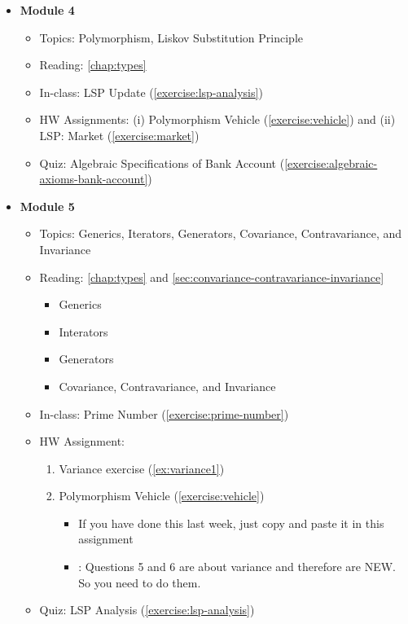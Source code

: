 \documentclass[oneside,11pt,dvipsnames]{book}
\newcommand{\red}[1]{{\color{red}{#1}}}
\begin{document}
\begin{itemize}
    \item \textbf{Module 4}
    \begin{itemize}
        \item Topics: Polymorphism, Liskov Substitution Principle
        \item Reading: \autoref{chap:types}
        \item In-class: LSP Update (\autoref{exercise:lsp-analysis})
        \item HW Assignments: (i) Polymorphism Vehicle (\autoref{exercise:vehicle}) and (ii) LSP: Market (\autoref{exercise:market}) 
        \item Quiz: Algebraic Specifications of Bank Account (\autoref{exercise:algebraic-axioms-bank-account}) 
    \end{itemize}

    \item \textbf{Module 5}
    \begin{itemize}
        \item Topics: Generics, Iterators, Generators, Covariance, Contravariance, and Invariance
        \item Reading: \autoref{chap:types} and \autoref{sec:convariance-contravariance-invariance}
        \begin{itemize}
            \item Generics
            \item Interators
            \item Generators
            \item Covariance, Contravariance, and Invariance
        \end{itemize}
        \item In-class: Prime Number (\autoref{exercise:prime-number})
        \item HW Assignment: 
        \begin{enumerate}
            \item Variance exercise (\autoref{ex:variance1})
        \item Polymorphism Vehicle (\autoref{exercise:vehicle})
        \begin{itemize}
        \item If you have done this last week, just copy and paste it in this assignment
        \item \red{Important}: Questions 5 and 6 are about variance and therefore are NEW. So you need to do them.
        \end{itemize} 
        \end{enumerate}            
        \item Quiz: LSP Analysis (\autoref{exercise:lsp-analysis})
    \end{itemize}


\end{itemize}
\end{document}
